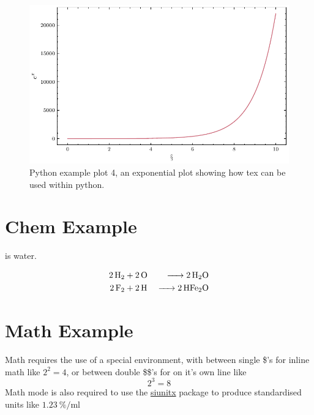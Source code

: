 \begin{figure}[h!]
    \centering
    \includegraphics{Python_plotting_example/example_4.pdf}
    \caption[Python example plot 4]{Python example plot 4, an exponential plot showing how tex can be used within python.}
    \label{fig:ch2/example_4}
\end{figure}



\section{Chem Example}

 is water. 


\begin{align}
    \ce{2H2& + 2O &-> 2H2O} \\
   \ce{2F2& + 2H &-> 2HFe2O}
\end{align}


\section{Math Example}
Math requires the use of a special environment, with between single \$'s for inline math like $2^2=4$, or between double \$\$'s for on it's own line like $$2^3=8$$ Math mode is also required to use the \href{https://mirror.aarnet.edu.au/pub/CTAN/macros/latex/contrib/siunitx/siunitx.pdf}{siunitx} package to produce standardised units like $\SI{1.23}{\percent\per\milli\litre}$


